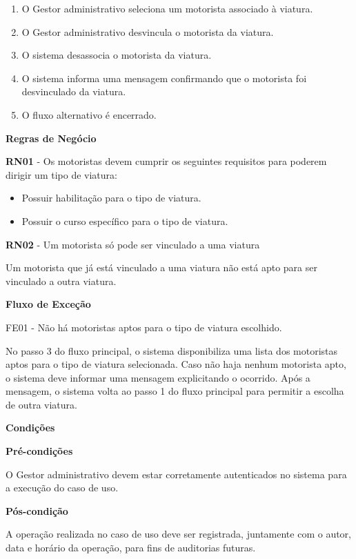     \begin{enumerate}
      \item O Gestor administrativo seleciona um motorista associado à viatura.
      \item O Gestor administrativo desvincula o motorista da viatura.	
      \item O sistema desassocia o motorista da viatura.
      \item O sistema informa uma mensagem confirmando que o motorista foi desvinculado da viatura.
      \item O fluxo alternativo é encerrado.
      
    \end{enumerate}
  
  
   {\raggedright
      \textbf{Regras de Negócio}
   }
   
   \textbf{RN01} - Os motoristas devem cumprir os seguintes requisitos para poderem dirigir um tipo de viatura:
   
    \begin{itemize}
     \item Possuir habilitação para o tipo de viatura.
     \item Possuir o curso específico para o tipo de viatura.
    \end{itemize}

   \textbf{RN02} - Um motorista só pode ser vinculado a uma viatura
   
    Um motorista que já está vinculado a uma viatura não está apto para ser vinculado a outra viatura.

   
   {\raggedright
      \textbf{Fluxo de Exceção}
   }
   
    FE01 - Não há motoristas aptos para o tipo de viatura escolhido.

      No passo 3 do fluxo principal, o sistema disponibiliza uma lista dos motoristas aptos para o tipo de viatura selecionada.
      Caso não haja nenhum motorista apto, o sistema deve informar uma mensagem explicitando o ocorrido. Após a mensagem, o sistema
      volta ao passo 1 do fluxo principal para permitir a escolha de outra viatura.
	
   {\raggedright
      \textbf{Condições}
   }
   
    
   \textbf{Pré-condições}
   
   O Gestor administrativo devem estar corretamente autenticados no sistema para a execução do caso de uso.
   
   \textbf{Pós-condição}
   
   A operação realizada no caso de uso deve ser registrada, juntamente com o autor, data e horário da operação, para fins de auditorias futuras.

  \vfill
  \pagebreak